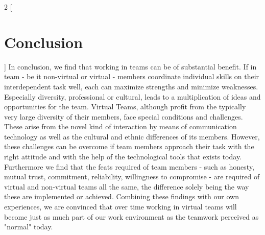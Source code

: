 \begin{multicols}{2}
[\section{Conclusion}]
In conclusion, we find that working in teams can be of substantial benefit. If in team - be it non-virtual or virtual - members coordinate individual skills on their interdependent task well, each can maximize strengths and minimize weaknesses. Especially diversity, professional or cultural, leads to a multiplication of ideas and opportunities for the team.
Virtual Teams, although profit from the typically very large diversity of their members, face special conditions and challenges. These arise from the novel kind of interaction by means of communication technology as well as the cultural and ethnic differences of its members. However, these challenges can be overcome if team members approach their task with the right attitude and with the help of the technological tools that exists today.
Furthermore we find that the feats required of team members - such as honesty, mutual trust, commitment, reliability, willingness to compromise - are required of virtual and non-virtual teams all the same, the difference solely being the way these are implemented or achieved. Combining these findings with our own experiences, we are convinced that over time working in virtual teams will become just as much part of our work environment as the teamwork perceived as "normal" today.
\end{multicols}